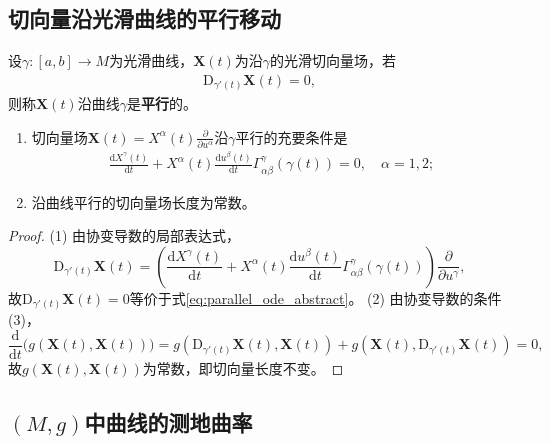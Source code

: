 \documentclass[../../main.tex]{subfiles}%
\begin{document}
\subsection{切向量沿光滑曲线的平行移动}

\begin{definition}
设$\gamma:[a,b]\to M$为光滑曲线，$\boldsymbol{X}(t)$为沿$\gamma$的光滑切向量场，若
\begin{align}
\mathrm{D}_{\gamma'(t)}\boldsymbol{X}(t)=0,\label{eq:parallel_def_abstract}
\end{align}
则称$\boldsymbol{X}(t)$沿曲线$\gamma$是\textbf{平行}的。
\end{definition}

\begin{theorem}
\begin{enumerate}[(1)]
\item 切向量场$\boldsymbol{X}(t)=X^\alpha(t)\frac{\partial}{\partial u^\alpha}$沿$\gamma$平行的充要条件是
\begin{align}
\frac{\mathrm{d}X^\gamma(t)}{\mathrm{d}t}+X^\alpha(t)\frac{\mathrm{d}u^\beta(t)}{\mathrm{d}t}\Gamma_{\alpha\beta}^\gamma(\gamma(t))=0,\quad \alpha=1,2;\label{eq:parallel_ode_abstract}
\end{align}
\item 沿曲线平行的切向量场长度为常数。
\end{enumerate}
\end{theorem}

\begin{proof}

(1) 由协变导数的局部表达式，
\[
\mathrm{D}_{\gamma'(t)}\boldsymbol{X}(t)=\left(\frac{\mathrm{d}X^\gamma(t)}{\mathrm{d}t}+X^\alpha(t)\frac{\mathrm{d}u^\beta(t)}{\mathrm{d}t}\Gamma_{\alpha\beta}^\gamma(\gamma(t))\right)\frac{\partial}{\partial u^\gamma},
\]
故$\mathrm{D}_{\gamma'(t)}\boldsymbol{X}(t)=0$等价于式\eqref{eq:parallel_ode_abstract}。
(2) 由协变导数的条件(3)，
\[
\frac{\mathrm{d}}{\mathrm{d}t}\big(g(\boldsymbol{X}(t),\boldsymbol{X}(t))\big)=g(\mathrm{D}_{\gamma'(t)}\boldsymbol{X}(t),\boldsymbol{X}(t))+g(\boldsymbol{X}(t),\mathrm{D}_{\gamma'(t)}\boldsymbol{X}(t))=0,
\]
故$g(\boldsymbol{X}(t),\boldsymbol{X}(t))$为常数，即切向量长度不变。

\end{proof}

\subsection{$(M,g)$中曲线的测地曲率}
\end{document}
